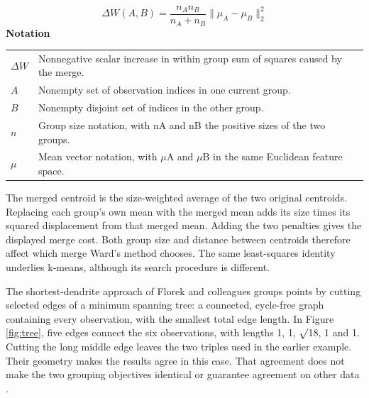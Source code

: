 \documentclass[10pt,letterpaper]{article}
\newcommand{\notlabel}{\noindent\textbf{Notation}\par\nobreak\vspace{4pt}}
\begin{document}
\par\noindent\begin{minipage}{\linewidth}
\begin{equation}\label{eq:ward}
\Delta W(A,B)=\frac{n_A n_B}{n_A+n_B}\lVert\mu_A-\mu_B\rVert_2^2
\end{equation}
\notlabel
{\fontsize{8.5}{10.5}\selectfont\setlength{\tabcolsep}{0pt}\renewcommand{\arraystretch}{1.12}
\begin{tabularx}{\linewidth}{@{}p{.14\linewidth}X@{}}
$\Delta W$ & Nonnegative scalar increase in within group sum of squares caused by the merge.\\
$A$ & Nonempty set of observation indices in one current group.\\
$B$ & Nonempty disjoint set of indices in the other group.\\
$n$ & Group size notation, with nA and nB the positive sizes of the two groups.\\
$\mu$ & Mean vector notation, with \ensuremath{\mu}A and \ensuremath{\mu}B in the same Euclidean feature space.\\
\end{tabularx}}
\par\vspace{2pt}
\end{minipage}\par
The merged centroid is the size-weighted average of the two original centroids. Replacing each group's own mean with the merged mean adds its size times its squared displacement from that merged mean. Adding the two penalties gives the displayed merge cost. Both group size and distance between centroids therefore affect which merge Ward's method chooses. The same least-squares identity underlies k-means, although its search procedure is different.\par

The shortest-dendrite approach of Florek and colleagues groups points by cutting selected edges of a minimum spanning tree: a connected, cycle-free graph containing every observation, with the smallest total edge length. In Figure \ref{fig:tree}, five edges connect the six observations, with lengths 1, 1, \ensuremath{\surd}18, 1 and 1. Cutting the long middle edge leaves the two triples used in the earlier example. Their geometry makes the results agree in this case. That agreement does not make the two grouping objectives identical or guarantee agreement on other data \cite{florek,calinski}.\par
\end{document}
